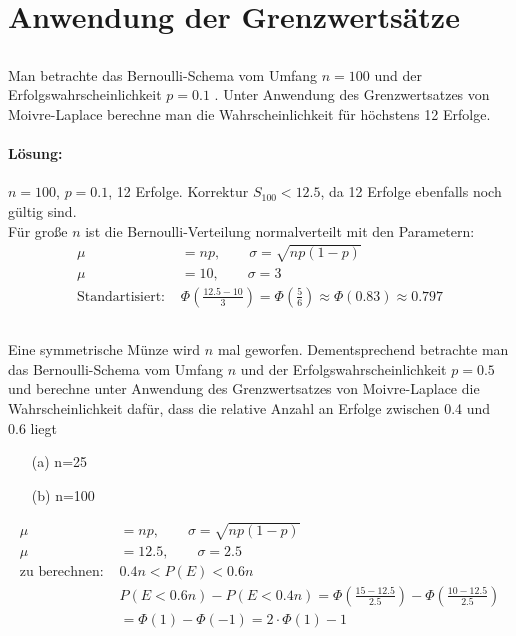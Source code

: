 \documentclass[ngerman]{scrartcl}
\begin{document}
\section{Anwendung der Grenzwertsätze}
\subsection{}
Man betrachte das Bernoulli-Schema vom Umfang $n=100$ und der Erfolgswahrscheinlichkeit $p=0.1$ . Unter Anwendung des Grenzwertsatzes von Moivre-Laplace berechne man die Wahrscheinlichkeit für höchstens 12 Erfolge.
\paragraph{Lösung:}
$n = 100$, $p = 0.1$, 12 Erfolge. Korrektur $S_{100} < 12.5$, da 12 Erfolge ebenfalls noch gültig sind.\\
Für große $n$ ist die Bernoulli-Verteilung normalverteilt mit den Parametern:
\begin{align*}
\mu &= np,\qquad \sigma = \sqrt{np(1-p)}\\
\mu &= 10,\qquad\sigma = 3\\
\text{Standartisiert: } &\Phi \left(\frac{12.5-10}{3}\right) = \Phi\left(\frac{5}{6}\right) \approx \Phi (0.83) \approx 0.797
\end{align*}

\subsection{}
Eine symmetrische Münze wird $n$ mal geworfen. Dementsprechend betrachte man das Bernoulli-Schema vom Umfang $n$ und der Erfolgswahrscheinlichkeit $p=0.5$ und berechne unter Anwendung des Grenzwertsatzes von Moivre-Laplace die Wahrscheinlichkeit dafür, dass die relative Anzahl an Erfolge zwischen 0.4 und 0.6 liegt
\begin{enumerate}
\item[(a)] n=25
\item[(b)] n=100
\end{enumerate}
\begin{align*}
\mu &= np,\qquad \sigma = \sqrt{np(1-p)}\\
\mu &= 12.5,\qquad\sigma = 2.5\\
\text{zu berechnen: }&0.4n < P(E) < 0.6n \\
&P(E<0.6n) - P(E<0.4n)= \Phi\left(\frac{15 - 12.5}{2.5}\right) - \Phi\left(\frac{10 - 12.5}{2.5}\right)\\
&= \Phi(1) - \Phi(-1) = 2\cdot \Phi (1) - 1  
\end{align*}
\end{document}
